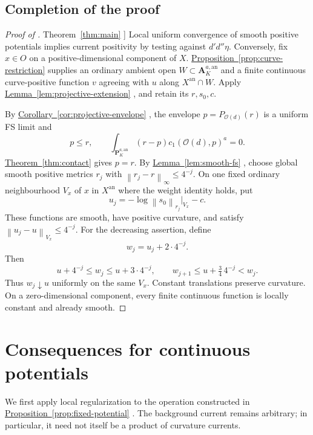 \documentclass[11pt]{amsart}
\theoremstyle{definition}
\theoremstyle{remark}
\numberwithin{equation}{section}
\newcommand{\ddc}{d'd''}
\newcommand{\an}{\mathrm{an}}
\newcommand{\PP}{\mathbf P}
\newcommand{\Aff}{\mathbf A}
\newcommand{\OO}{\mathcal O}
\newcommand{\norm}[1]{\left\lVert#1\right\rVert}
\newcommand{\namedref}[2]{%
 \begingroup
 \ifstrequal{#1}{Section}{\hypersetup{linkcolor=sectionteal}}{%
  \ifstrequal{#1}{Appendix}{\hypersetup{linkcolor=sectionteal}}{}}%
 \hyperref[#2]{#1~\ref*{#2}}%
 \endgroup}
\begin{document}
\subsection{Completion of the proof}\label{subsec:regularization-proof}

\begin{proof}[Proof of \namedref{Theorem}{thm:main}]
Local uniform convergence of smooth positive potentials implies current
positivity by testing against \(\ddc\eta\).
Conversely, fix \(x\in O\) on a positive-dimensional component of \(X\).
\namedref{Proposition}{prop:curve-restriction} supplies an ordinary ambient open
\(W\subset\Aff_K^{a,\an}\) and a finite continuous curve-positive
function \(v\) agreeing with \(u\) along \(X^{\an}\cap W\).
Apply \namedref{Lemma}{lem:projective-extension}, and retain its \(r,s_0,c\).

By \namedref{Corollary}{cor:projective-envelope}, the envelope \(p=P_{\OO(d)}(r)\) is a uniform
FS limit and
\[
 p\le r,\qquad
 \int_{\PP_K^{a,\an}}(r-p)c_1(\OO(d),p)^a=0.
\]
\namedref{Theorem}{thm:contact} gives \(p=r\).
By \namedref{Lemma}{lem:smooth-fs}, choose global smooth positive metrics \(r_j\) with
\(\norm{r_j-r}_\infty\le4^{-j}\).
On one fixed ordinary neighbourhood \(V_x\) of \(x\) in \(X^{\an}\)
where the weight identity holds, put
\[
 u_j=-\log\norm{s_0}_{r_j}\big|_{V_x}-c.
\]
These functions are smooth, have positive curvature, and satisfy
\(\norm{u_j-u}_{V_x}\le4^{-j}\).
For the decreasing assertion, define
\[
 w_j=u_j+2\cdot4^{-j}.
\]
Then
\[
 u+4^{-j}\le w_j\le u+3\cdot4^{-j},
 \qquad w_{j+1}\le u+\tfrac34\,4^{-j}<w_j.
\]
Thus \(w_j\downarrow u\) uniformly on the same \(V_x\).
Constant translations preserve curvature.
On a zero-dimensional component, every finite continuous function is
locally constant and already smooth.
\end{proof}

\section{Consequences for continuous potentials}\label{sec:consequences}

We first apply local regularization to the operation constructed in
\namedref{Proposition}{prop:fixed-potential}. The background current remains
arbitrary; in particular, it need not itself be a product of curvature
currents.
\end{document}
